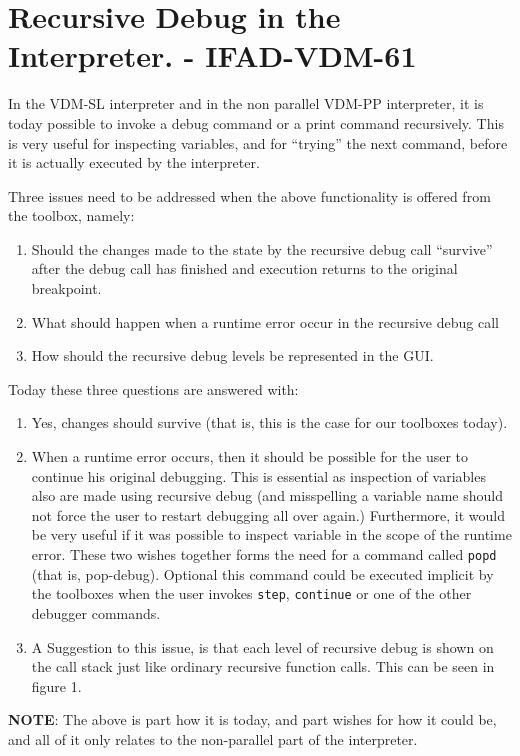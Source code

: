 \documentclass[]{article}
\begin{document}
\section{Recursive Debug in the Interpreter. - IFAD-VDM-61}
\label{sec:first}
In the VDM-SL interpreter and in the non parallel VDM-PP interpreter, it is
today possible to invoke a debug command or a print command
recursively. This is very useful for inspecting variables, and for
``trying'' the next command, before it is actually executed by the
interpreter.

Three issues need to be addressed when the above functionality is offered
from the toolbox, namely:
\begin{enumerate}
\item Should the changes made to the state by the recursive debug call
``survive'' after the debug call has finished and execution returns to the
original breakpoint.
\item What should happen when a runtime error occur in the recursive debug
call
\item How should the recursive debug levels be represented in the GUI.
\end{enumerate}

Today these three questions are answered with:
\begin{enumerate}
\item Yes, changes should survive (that is, this is the case for our
  toolboxes today).
\item When a runtime error occurs, then it should be possible for the user
  to continue his original debugging. This is essential as inspection of
  variables also are made using recursive debug (and misspelling a variable
  name should not force the user to restart debugging all over again.)
  Furthermore, it would be very useful if it was possible to inspect
  variable in the scope of the runtime error. These two wishes together
  forms the need for a command called \texttt{popd} (that is, pop-debug).
  Optional this command could be executed implicit by the toolboxes when
  the user invokes \texttt{step}, \texttt{continue} or one of the other
  debugger commands.
\item A Suggestion to this issue, is that each level of recursive debug is
  shown on the call stack just like ordinary recursive function calls. This
  can be seen in figure 1.
\end{enumerate}

\textbf{NOTE}: The above is part how it is today, and part wishes for how
it could be, and all of it only relates to the non-parallel part of the interpreter.
\end{document}
